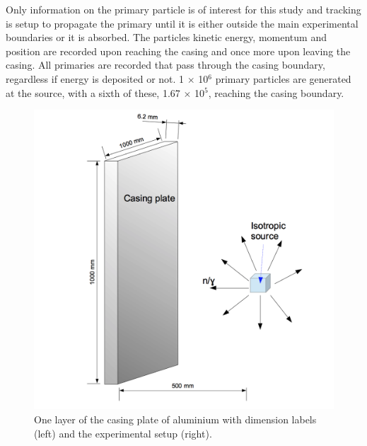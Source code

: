 Only information on the primary particle is of interest for this study and tracking is setup to propagate the primary until it is either outside the main experimental boundaries or it is absorbed. The particles kinetic energy, momentum and position are recorded upon reaching the casing and once more upon leaving the casing. All primaries are recorded that pass through the casing boundary, regardless if energy is deposited or not. 1 $\times$ 10$^{6}$ primary particles are generated at the source, with a sixth of these, 1.67 $\times$ 10$^{5}$, reaching the casing boundary.


\begin{figure}[htbp]
\begin{center}
\includegraphics[width=120mm]{Chapter6/figures/setupDiagram1.png}
\caption{One layer of the casing plate of aluminium with dimension labels (left) and the experimental setup (right).}
\label{fig:casingDiagram}
\end{center}
\end{figure}

